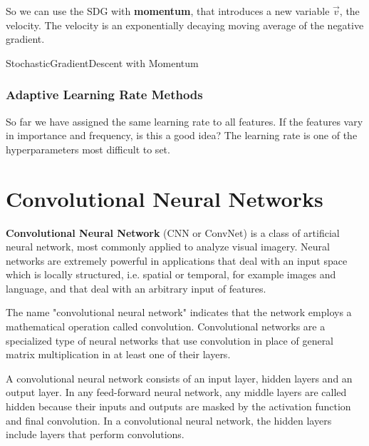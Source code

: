So we can use the SDG with \textbf{momentum}, that introduces a new variable \(\vec{v}\), the velocity. The velocity is an exponentially decaying moving average of the negative gradient.

\begin{algorithm}
    \caption{StochasticGradientDescent with Momentum}
    \label{alg:stochastic_gradient_descent_momentum}

    
\end{algorithm}

\subsubsection{Adaptive Learning Rate Methods}
So far we have assigned the same learning rate to all features. If the features vary in importance and frequency, is this a good idea? The learning rate is one of the hyperparameters most difficult to set.

\section{Convolutional Neural Networks}
\textbf{Convolutional Neural Network} (CNN or ConvNet) is a class of artificial neural network, most commonly applied to analyze visual imagery.  Neural networks are extremely powerful in applications that deal with an input space which is locally structured, i.e. spatial or temporal, for example images and language, and that deal with an arbitrary input of features.

The name "convolutional neural network" indicates that the network employs a mathematical operation called convolution. Convolutional networks are a specialized type of neural networks that use convolution in place of general matrix multiplication in at least one of their layers.

A convolutional neural network consists of an input layer, hidden layers and an output layer. In any feed-forward neural network, any middle layers are called hidden because their inputs and outputs are masked by the activation function and final convolution. In a convolutional neural network, the hidden layers include layers that perform convolutions.

